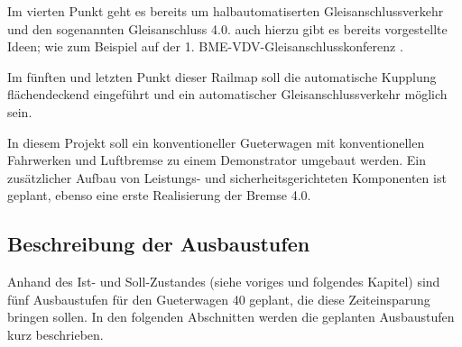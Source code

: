 Im vierten Punkt geht es bereits um halbautomatiserten Gleisanschlussverkehr und den sogenannten Gleisanschluss 4.0. auch hierzu gibt es bereits vorgestellte Ideen; wie zum Beispiel auf der 1. BME-VDV-Gleisanschlusskonferenz \cite{GAK}. \par
Im fünften und letzten Punkt dieser Railmap soll die automatische Kupplung flächendeckend eingeführt und ein automatischer Gleisanschlussverkehr möglich sein.\par
In diesem Projekt soll ein \gls{konventioneller Gueterwagen} mit konventionellen Fahrwerken und Luftbremse zu einem \gls{Demonstrator} umgebaut werden. Ein zusätzlicher Aufbau von Leistungs- und sicherheitsgerichteten Komponenten ist geplant, ebenso eine erste Realisierung der Bremse 4.0\cite{Stephenson, ETR_2}.\par

\subsection{Beschreibung der Ausbaustufen}\label{sec:Ausbaustufen}
Anhand des Ist- und Soll-Zustandes (siehe voriges und folgendes Kapitel) sind fünf Ausbaustufen für den \gls{Gueterwagen 40} geplant, die diese Zeiteinsparung bringen sollen. In den folgenden Abschnitten werden die geplanten Ausbaustufen kurz beschrieben.\par

